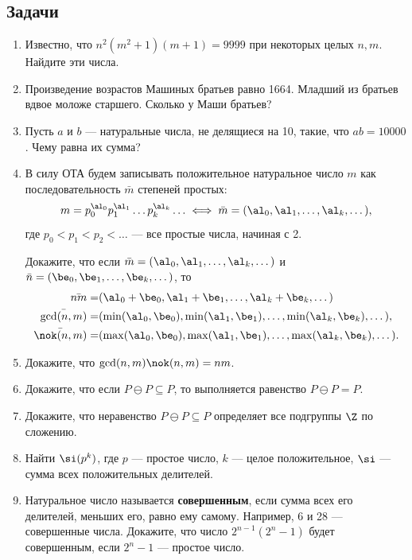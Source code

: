 \subsection*{Задачи}
\begin{enumerate}
\item Известно, что $n^2(m^2+1)(m+1)=9999$ при некоторых целых $n,m$. Найдите эти числа.
\item Произведение возрастов Машиных братьев равно 1664. Младший из братьев вдвое моложе старшего. Сколько у Маши братьев?
\item Пусть $a$ и $b$ --- натуральные числа, не делящиеся на 10, такие, что $ab=10000$. Чему равна их сумма?
\item В силу ОТА будем записывать положительное натуральное число $m$ как последовательность $\bar m$ степеней простых:
$$
m=p_0^{\al_0}p_1^{\al_1}\dots p_k^{\al_k}\ldots\iff \bar m=(\al_0,\al_1,\dots,\al_k,\dots),
$$
где $p_0<p_1<p_2<\dots$ --- все простые числа, начиная с 2.

Докажите, что если $\bar m=(\al_0,\al_1,\dots,\al_k,\dots)$ и $\bar n=(\be_0,\be_1,\dots,\be_k,\dots)$, то
\begin{align*}
\bar{nm} = & (\al_0+\be_0,\al_1+\be_1,\dots,\al_k+\be_k,\dots) \\
\bar{\gcd(n,m)} = & (\min(\al_0,\be_0),\min(\al_1,\be_1),\dots,\min(\al_k,\be_k),\dots), \\
\bar{\nok(n,m)} = & (\max(\al_0,\be_0),\max(\al_1,\be_1),\dots,\max(\al_k,\be_k),\dots).
\end{align*}

\item Докажите, что $\gcd(n,m)\nok(n,m)=nm$.

\item Докажите, что если $P\ominus P\subseteq P$, то выполняется равенство $P\ominus P=P$.
\item Докажите, что неравенство $P\ominus P\subseteq P$ определяет все подгруппы $\Z$ по сложению.
\item Найти $\si(p^k)$, где $p$ --- простое число, $k$ --- целое положительное, $\si$ --- сумма всех положительных делителей.
\item Натуральное число называется \textbf{совершенным}, если сумма всех его делителей, меньших его, равно ему самому. Например, 6 и 28 --- совершенные числа. Докажите, что число $2^{n-1}(2^n-1)$ будет совершенным, если $2^n-1$ --- простое число.
\end{enumerate}

